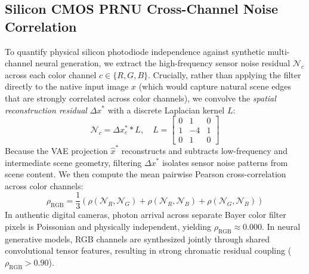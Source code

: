 \documentclass{article}
\theoremstyle{definition}
\begin{document}
\subsection{Silicon CMOS PRNU Cross-Channel Noise Correlation}
To quantify physical silicon photodiode independence against synthetic multi-channel neural generation, we extract the high-frequency sensor noise residual $\mathcal{N}_c$ across each color channel $c \in \{R, G, B\}$. Crucially, rather than applying the filter directly to the native input image $x$ (which would capture natural scene edges that are strongly correlated across color channels), we convolve the \textit{spatial reconstruction residual} $\Delta x^*$ with a discrete Laplacian kernel $L$:
\begin{equation}
\mathcal{N}_c = \Delta x^*_c * L, \quad L = \begin{bmatrix} 0 & 1 & 0 \\ 1 & -4 & 1 \\ 0 & 1 & 0 \end{bmatrix}
\end{equation}
Because the VAE projection $\hat{x}^*$ reconstructs and subtracts low-frequency and intermediate scene geometry, filtering $\Delta x^*$ isolates sensor noise patterns from scene content. We then compute the mean pairwise Pearson cross-correlation across color channels:
\begin{equation}
\rho_{\text{RGB}} = \frac{1}{3} \left( \rho(\mathcal{N}_R, \mathcal{N}_G) + \rho(\mathcal{N}_R, \mathcal{N}_B) + \rho(\mathcal{N}_G, \mathcal{N}_B) \right)
\end{equation}
In authentic digital cameras, photon arrival across separate Bayer color filter pixels is Poissonian and physically independent, yielding $\rho_{\text{RGB}} \approx 0.000$. In neural generative models, RGB channels are synthesized jointly through shared convolutional tensor features, resulting in strong chromatic residual coupling ($\rho_{\text{RGB}} > 0.90$).
\end{document}
